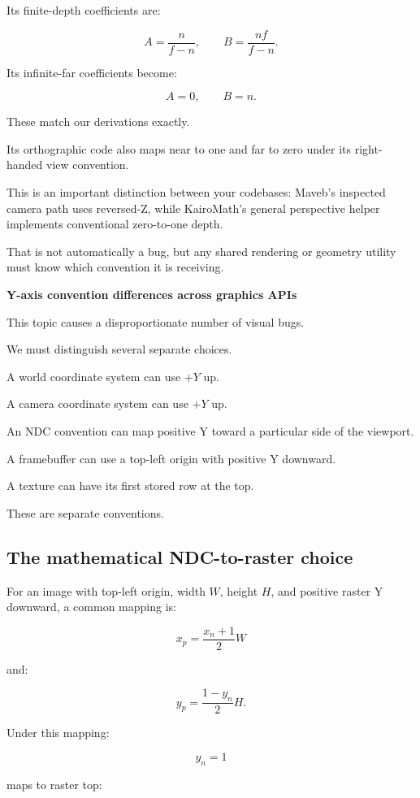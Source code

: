 Its finite-depth coefficients are:

\[
 \boxed{ A=\frac n{f-n}, \qquad B=\frac{nf}{f-n} }.
\]

Its infinite-far coefficients become:

\[
 \boxed{ A=0,\qquad B=n }.
\]

These match our derivations exactly.

Its orthographic code also maps near to one and far to zero under its right-handed view convention.

This is an important distinction between your codebases: Maveb's inspected camera path uses reversed-Z, while KairoMath's general perspective helper implements conventional zero-to-one depth.

That is not automatically a bug, but any shared rendering or geometry utility must know which convention it is receiving.

\textbf{Y-axis convention differences across graphics APIs}

This topic causes a disproportionate number of visual bugs.

We must distinguish several separate choices.

A world coordinate system can use \(+Y\) up.

A camera coordinate system can use \(+Y\) up.

An NDC convention can map positive Y toward a particular side of the viewport.

A framebuffer can use a top-left origin with positive Y downward.

A texture can have its first stored row at the top.

These are separate conventions.

\subsection{The mathematical NDC-to-raster choice}\label{02-foundations-ii-ch033-the-mathematical-ndc-to-raster-choice}

For an image with top-left origin, width \(W\), height \(H\), and positive raster Y downward, a common mapping is:

\[
 \boxed{ x_p=\frac{x_n+1}{2}W }
\]

and:

\[
 \boxed{ y_p=\frac{1-y_n}{2}H }.
\]

Under this mapping:

\[
 y_n=1
\]

maps to raster top:

